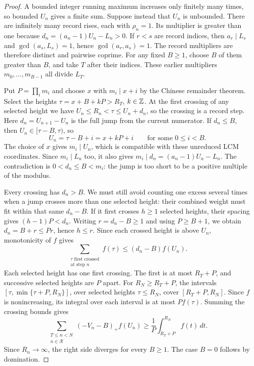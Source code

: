 \documentclass[11pt]{article}
\begin{document}
\begin{proof}
A bounded integer running maximum increases only finitely many times, so
bounded $U_n$ gives a finite sum. Suppose instead that $U_n$ is unbounded.
There are infinitely many record rises, each with $\rho_n=1$. Its multiplier is
greater than one because $d_n=(a_n-1)U_n-L_n>0$. If $r<s$ are record
indices, then $a_r\mid L_s$ and $\gcd(a_s,L_s)=1$, hence
$\gcd(a_r,a_s)=1$. The record multipliers are therefore distinct and pairwise
coprime. For any fixed $B\ge1$, choose $B$ of them greater than $B$,
and take $T$ after their indices. These earlier multipliers
$m_0,\ldots,m_{B-1}$ all divide $L_T$.

Put $P=\prod_i m_i$ and choose $x$ with $m_i\mid x+i$ by the
Chinese remainder theorem. Select the heights $\tau=x+B+kP>R_T$,
$k\in\mathbb{Z}$. At the first crossing of any selected height we have
$U_n\le R_n<\tau\le U_n+d_n$, so the crossing is a record step.
Here $d_n=U_{n+1}-U_n$ is the full jump from the current numerator.
If $d_n\le B$, then $U_n\in[\tau-B,\tau)$, so
\[
 U_n=\tau-B+i=x+kP+i\qquad\text{for some }0\le i<B.
\]
The choice of $x$ gives $m_i\mid U_n$, which is compatible with these
unreduced LCM coordinates. Since $m_i\mid L_n$ too, it also gives
$m_i\mid d_n=(a_n-1)U_n-L_n$. The contradiction is
$0<d_n\le B<m_i$: the jump is too short to be a positive multiple
of the modulus.

Every crossing has $d_n>B$. We must still avoid counting one excess
several times when a jump crosses more than one selected height:
their combined weight must fit within that same $d_n-B$. If it first crosses $h\ge1$ selected heights,
their spacing gives $(h-1)P<d_n$.
Writing $r=d_n-B\ge1$ and using $P\ge B+1$, we obtain
$d_n=B+r\le Pr$, hence $h\le r$. Since each crossed height is above
$U_n$, monotonicity of $f$ gives
\[
 \sum_{\substack{\tau\text{ first crossed}\\\text{at step }n}}f(\tau)
 \le(d_n-B)f(U_n).
\]
Each selected height has one first crossing. The first is at most
$R_T+P$, and successive selected heights are $P$ apart. For
$R_N\ge R_T+P$, the intervals
$[\tau,\min\{\tau+P,R_N\}]$, over selected heights $\tau\le R_N$,
cover $[R_T+P,R_N]$. Since $f$ is nonincreasing, its integral over
each interval is at most $P f(\tau)$. Summing the crossing bounds gives
\begin{equation}\label{long243:eq:weightedcrossing}
 \sum_{\substack{T\le n<N\\n\in\mathcal R}}(-V_n-B)_+f(U_n)
 \ge\frac1P\int_{R_T+P}^{R_N} f(t)\,dt.
\end{equation}
Since $R_n\to\infty$, the right side diverges for every $B\ge1$.
The case $B=0$ follows by domination.
\end{proof}
\end{document}

